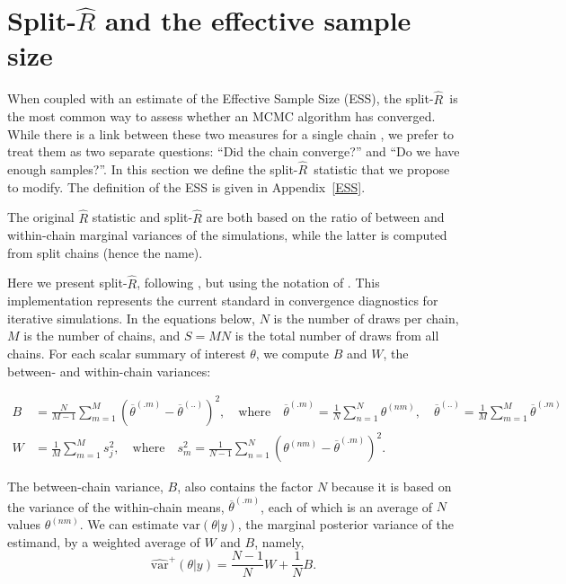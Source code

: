 \documentclass[american,]{article}
\newcommand{\sRhat}{split-$\widehat{R}$}
\begin{document}
\hypertarget{SplitRhat}{%
\section{Split-$\widehat{R}$ and the effective sample size}\label{SplitRhat}}

When coupled with an estimate of the Effective Sample Size (ESS), the  \sRhat\ is the most common way to  assess whether an MCMC algorithm has converged.  While there is a link between these two measures 
for a single chain \citep{vats2018revisiting}, we prefer to treat them as two separate questions: ``Did the chain converge?'' and ``Do we have enough samples?''.  In this section we define the \sRhat\ statistic that we propose to modify. The definition of the ESS is given in Appendix~\ref{ESS}.


The original \(\widehat{R}\) statistic
\citep{Gelman+Rubin:1992, Brooks+Gelman:1998} and
split-\(\widehat{R}\) \citep{BDA3} are both based on the ratio of
between and within-chain marginal variances of the simulations, while
the latter is computed from split chains (hence the name).

Here we present split-\(\widehat{R}\),
following \citet{BDA3}, but using the notation of
\citet{StanBook}. This implementation represents the current 
standard in convergence diagnostics for iterative simulations. In the
equations below, \(N\) is the number of draws per chain, \(M\) is the
number of chains, and \(S=MN\) is the total number of draws from all
chains. For each scalar summary of interest \(\theta\), we compute \(B\)
and \(W\), the between- and within-chain variances:

\begin{align}
B &= \frac{N}{M-1}\sum_{m=1}^{M}(\overline{\theta}^{(.m)} - 
\overline{\theta}^{(..)})^2, \quad \mbox{where} \quad 
\overline{\theta}^{(.m)}=\frac{1}{N}\sum_{n=1}^N \theta^{(nm)}, \quad
\overline{\theta}^{(..)} = \frac{1}{M}\sum_{m=1}^M\overline{\theta}^{(.m)} 
\\
W &= \frac{1}{M}\sum_{m=1}^{M}s_j^2, \quad \mbox{where} \quad
s_m^2=\frac{1}{N-1} \sum_{n=1}^N (\theta^{(nm)}-\overline{\theta}^{(.m)})^2.
\end{align}

The between-chain variance, \(B\), also contains the factor \(N\)
because it is based on the variance of the within-chain means,
\(\overline{\theta}^{(.m)}\), each of which is an average of \(N\)
values \(\theta^{(nm)}\). We can estimate \(\mbox{var}(\theta | y)\),
the marginal posterior variance of the estimand, by a weighted average
of \(W\) and \(B\), namely,
\begin{equation}
\widehat{\mbox{var}}^+(\theta| y) = \frac{N-1}{N}W + \frac{1}{N}B.
\end{equation}
\end{document}
